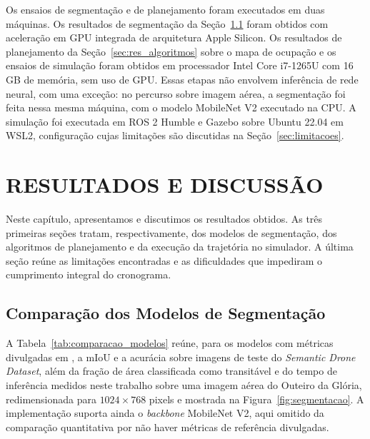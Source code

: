 \documentclass[
    12pt,
    openright,
    oneside,
    a4paper,
    english,
    brazil
]{abntex2}
\begin{document}
Os ensaios de segmentação e de planejamento foram executados em duas máquinas. Os resultados de segmentação da Seção~\ref{sec:res_segmentacao} foram obtidos com aceleração em GPU integrada de arquitetura Apple Silicon. Os resultados de planejamento da Seção~\ref{sec:res_algoritmos} sobre o mapa de ocupação e os ensaios de simulação foram obtidos em processador Intel Core i7-1265U com 16 GB de memória, sem uso de GPU. Essas etapas não envolvem inferência de rede neural, com uma exceção: no percurso sobre imagem aérea, a segmentação foi feita nessa mesma máquina, com o modelo MobileNet V2 executado na CPU. A simulação foi executada em ROS 2 Humble e Gazebo sobre Ubuntu 22.04 em WSL2, configuração cujas limitações são discutidas na Seção~\ref{sec:limitacoes}.

\chapter{RESULTADOS E DISCUSSÃO}
\label{cap:resultados}

Neste capítulo, apresentamos e discutimos os resultados obtidos. As três primeiras seções tratam, respectivamente, dos modelos de segmentação, dos algoritmos de planejamento e da execução da trajetória no simulador. A última seção reúne as limitações encontradas e as dificuldades que impediram o cumprimento integral do cronograma.

\section{Comparação dos Modelos de Segmentação}
\label{sec:res_segmentacao}

A Tabela~\ref{tab:comparacao_modelos} reúne, para os modelos com métricas divulgadas em \cite{junior2024_models}, a mIoU e a acurácia sobre imagens de teste do \emph{Semantic Drone Dataset}, além da fração de área classificada como transitável e do tempo de inferência medidos neste trabalho sobre uma imagem aérea do Outeiro da Glória, redimensionada para $1024 \times 768$ pixels e mostrada na Figura~\ref{fig:segmentacao}. A implementação suporta ainda o \textit{backbone} MobileNet V2, aqui omitido da comparação quantitativa por não haver métricas de referência divulgadas.
\end{document}
